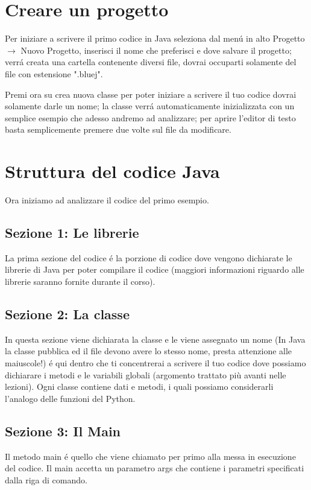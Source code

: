 \documentclass{article}
\begin{document}
\section{Creare un progetto}
\noindent Per iniziare a scrivere il primo codice in Java seleziona dal menú in alto Progetto $\to$ Nuovo Progetto, inserisci il nome che preferisci e dove salvare il progetto; verrá creata una cartella contenente diversi file, dovrai occuparti solamente del file con estensione ".bluej".

\noindent Premi ora su crea nuova classe per poter iniziare a scrivere il tuo codice dovrai solamente darle un nome; la classe verrá automaticamente inizializzata con un semplice esempio che adesso andremo ad analizzare; per aprire l'editor di testo basta semplicemente premere due volte sul file da modificare.

\section{Struttura del codice Java}

\noindent Ora iniziamo ad analizzare il codice del primo esempio.
\subsection{Sezione 1: Le librerie}
    \noindent La prima sezione del codice é la porzione di codice dove vengono dichiarate le librerie di Java per poter compilare il codice (maggiori informazioni riguardo alle librerie saranno fornite durante il corso).

\subsection{Sezione 2: La classe}
    \noindent In questa sezione viene dichiarata la classe e le viene assegnato un nome (In Java la classe pubblica ed il file devono avere lo stesso nome, presta attenzione alle maiuscole!) é qui dentro che ti concentrerai a scrivere il tuo codice dove possiamo dichiarare i metodi e le variabili globali (argomento trattato più avanti nelle lezioni). Ogni classe contiene dati e metodi, i quali possiamo considerarli l'analogo delle funzioni del Python.
    
\subsection{Sezione 3: Il Main}
    \noindent Il metodo main é quello che viene chiamato per primo alla messa in esecuzione del codice. Il main accetta un parametro args che contiene i parametri specificati dalla riga di comando.
    
\end{document}
